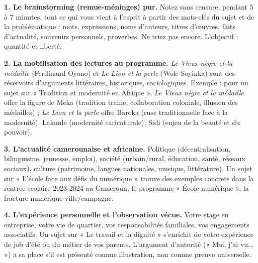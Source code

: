 \documentclass[11pt]{article}
\begin{document}
\begin{methode}
\textbf{1. Le brainstorming (remue-méninges) pur.} Notez sans censure, pendant 5 à 7 minutes, tout ce qui vous vient à l'esprit à partir des mots-clés du sujet et de la problématique : mots, expressions, noms d'auteurs, titres d'œuvres, faits d'actualité, souvenirs personnels, proverbes. Ne triez pas encore. L'objectif : quantité et liberté.

\textbf{2. La mobilisation des lectures au programme.} \emph{Le Vieux nègre et la médaille} (Ferdinand Oyono) et \emph{Le Lion et la perle} (Wole Soyinka) sont des réservoirs d'arguments littéraires, historiques, sociologiques. Exemple : pour un sujet sur « Tradition et modernité en Afrique », \emph{Le Vieux nègre et la médaille} offre la figure de Meka (tradition trahie, collaboration coloniale, illusion des médailles) ; \emph{Le Lion et la perle} offre Baroka (ruse traditionnelle face à la modernité), Lakunle (modernité caricaturale), Sidi (enjeu de la beauté et du pouvoir).

\textbf{3. L'actualité camerounaise et africaine.} Politique (décentralisation, bilinguisme, jeunesse, emploi), société (urbain/rural, éducation, santé, réseaux sociaux), culture (patrimoine, langues nationales, musique, littérature). Un sujet sur « L'école face aux défis du numérique » trouve des exemples concrets dans la rentrée scolaire 2023-2024 au Cameroun, le programme « École numérique », la fracture numérique ville/campagne.

\textbf{4. L'expérience personnelle et l'observation vécue.} Votre stage en entreprise, votre vie de quartier, vos responsabilités familiales, vos engagements associatifs. Un sujet sur « Le travail et la dignité » s'enrichit de votre expérience de job d'été ou du métier de vos parents. L'argument d'autorité (« Moi, j'ai vu... ») a sa place s'il est présenté comme illustration, non comme preuve universelle.
\end{methode}
\end{document}
